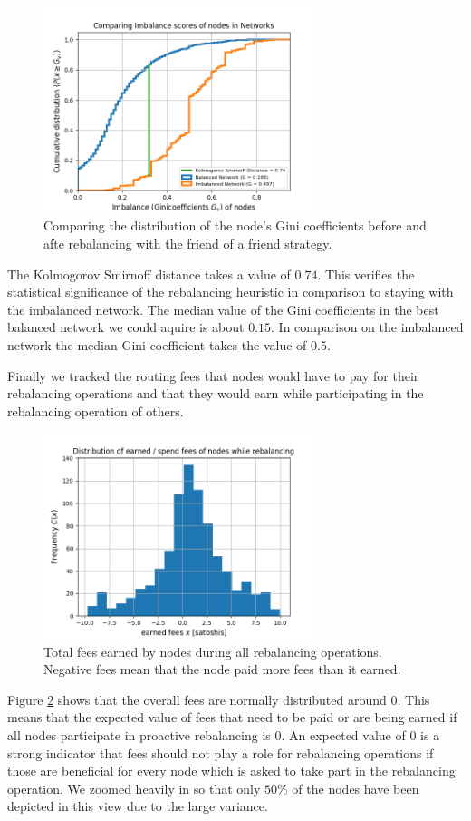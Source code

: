 \documentclass[a4paper]{paper}
\begin{document}
\begin{figure}
 \centering
 \includegraphics[width=8cm]{code/vs/fig/comparison distribution of Ginicoefficients.png}
 \caption{Comparing the distribution of the node's Gini coefficients before and afte rebalancing with the friend of a friend strategy.}
 \label{fig:cdf_gini}
 \end{figure}
 The Kolmogorov Smirnoff distance takes a value of $0.74$.
 This verifies the statistical significance of the rebalancing heuristic in comparison to staying with the imbalanced network.
The median value of the Gini coefficients in the best balanced network we could aquire is about $0.15$.
 In comparison on the imbalanced network the median Gini coefficient takes the value of $0.5$.

Finally we tracked the routing fees that nodes would have to pay for their rebalancing operations and that they would earn while participating in the rebalancing operation of others.
 \begin{figure}
 \centering
 \includegraphics[width=8cm]{code/vs/fig/distribution_of_fees.png}
 \caption{Total fees earned by nodes during all rebalancing operations. Negative fees mean that the node paid more fees than it earned.}
 \label{fig:fees}
 \end{figure}
 Figure \cref{fig:fees} shows that the overall fees are normally distributed around $0$.
 This means that the expected value of fees that need to be paid or are being earned if all nodes participate in proactive rebalancing is $0$.
An expected value of $0$ is a strong indicator that fees should not play a role for rebalancing operations if those are beneficial for every node which is asked to take part in the rebalancing operation.
 We zoomed heavily in so that only $50\%$ of the nodes have been depicted in this view due to the large variance.
\end{document}
